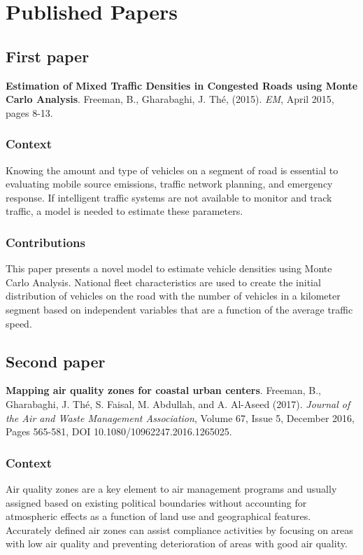 
\chapter{Published Papers}

\section{First paper}
\textbf{Estimation of Mixed Traffic Densities in Congested Roads using Monte Carlo Analysis}. Freeman, B., Gharabaghi, J.  Th\'e, (2015). \textit{EM}, April 2015, pages 8-13. 

\subsection{Context}
Knowing the amount and type of vehicles on a segment of road is essential to evaluating mobile source emissions, traffic network planning, and emergency response. If intelligent traffic systems are not available to monitor and track traffic, a model is needed to estimate these parameters.

\subsection{Contributions}
This paper presents a novel model to estimate vehicle densities using Monte Carlo Analysis. National fleet characteristics are used to create the initial distribution of vehicles on the road with the number of vehicles in a kilometer segment based on independent variables that are a function of the average traffic speed. 

\section{Second paper}

\textbf{Mapping air quality zones for coastal urban centers}. Freeman, B., Gharabaghi, J.  Th\'e, S. Faisal, M. Abdullah, and A. Al-Aseed (2017). \textit{Journal of the Air and Waste Management Association}, Volume 67, Issue 5, December 2016, Pages 565-581, DOI 10.1080/10962247.2016.1265025.

\subsection{Context}
Air quality zones are a key element to air management programs and usually assigned based on existing political boundaries without accounting for atmospheric effects as a function of land use and geographical features. Accurately defined air zones can assist compliance activities by focusing on areas with low air quality and preventing deterioration of areas with good air quality.

